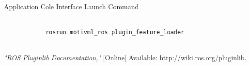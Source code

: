 \documentclass{article}
\newenvironment{longlisting}{\captionsetup{type=listing}}{}
\begin{document}
\begin{enumerate}
	\begin{longlisting}
		\caption{Application Cole Interface Launch Command}
		\begin{verbatim}
			
			rosrun motivml_ros plugin_feature_loader
			
		\end{verbatim}
		\label{ui}
	\end{longlisting}
	
\end{enumerate}

\begin{thebibliography}{9}
	\textit{"ROS Pluginlib Documentation,"} 
	[Online] Available: http://wiki.ros.org/pluginlib.
\end{thebibliography}
\end{document}
